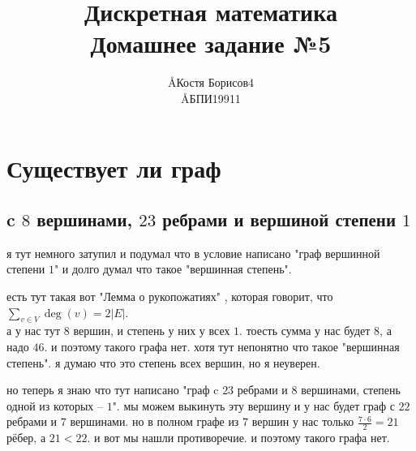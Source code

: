 \documentclass{article}
\title{Дискретная математика \\ Домашнее задание №5}
\author{\AA{Костя Борисов}{4} \\ \AA{БПИ199}{11}}
\newcommand{\ds}{\displaystyle}
\renewcommand{\f}{\frac}
\begin{document}
  \maketitle

  \section{Существует ли граф}
  \subsection{c $8$ вершинами, $23$ ребрами и вершиной степени $1$}
  я тут немного затупил и подумал что в условие написано "{}граф вершинной степени $1$"{}
  и долго думал что такое "{}вершинная степень"{}.
  \begin{cross}
    есть тут такая вот "{}Лемма о рукопожатиях"{} \cite{lem}, которая говорит, что $\ds \sum_{v\in V}\deg(v)=2|E|$. \\
    а у нас тут $8$ вершин, и степень у них у всех $1$.
    тоесть сумма у нас будет $8$, а надо $46$.
    и поэтому такого графа нет.
    хотя тут непонятно что такое "{}вершинная степень"{}.
    я думаю что это степень всех вершин, но я неуверен.
  \end{cross}

  но теперь я знаю что тут написано "{}граф c $23$ ребрами и $8$ вершинами, степень одной из которых -- $1$"{}.
  мы можем выкинуть эту вершину и у нас будет граф с $22$ ребрами и $7$ вершинами.
  но в полном графе из $7$ вершин у нас только $\f{7 \cdot 6}{2}=21$ рёбер, а $21 < 22$.
  и вот мы нашли противоречие.
  и поэтому такого графа нет.
\end{document}
